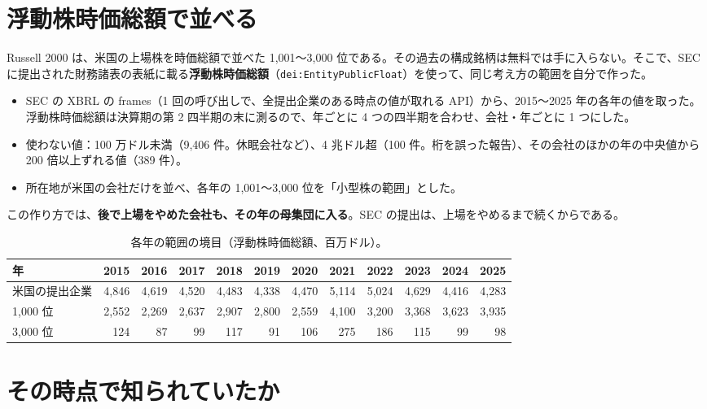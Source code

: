 \documentclass[xelatex,ja=standard,jafont=haranoaji,a4paper,10pt,openany]{bxjsreport}
\newcommand{\code}[1]{\texttt{#1}}
\begin{document}
\section{浮動株時価総額で並べる}

Russell 2000 は、米国の上場株を時価総額で並べた 1,001〜3,000 位である。その過去の構成銘柄は無料では手に入らない。そこで、SEC に提出された財務諸表の表紙に載る\textbf{浮動株時価総額}（\code{dei:EntityPublicFloat}）を使って、同じ考え方の範囲を自分で作った。

\begin{itemize}
\item SEC の XBRL の frames（1 回の呼び出しで、全提出企業のある時点の値が取れる API）から、2015〜2025 年の各年の値を取った。浮動株時価総額は決算期の第 2 四半期の末に測るので、年ごとに 4 つの四半期を合わせ、会社・年ごとに 1 つにした。
\item 使わない値：100 万ドル未満（9,406 件。休眠会社など）、4 兆ドル超（100 件。桁を誤った報告）、その会社のほかの年の中央値から 200 倍以上ずれる値（389 件）。
\item 所在地が米国の会社だけを並べ、各年の 1,001〜3,000 位を「小型株の範囲」とした。
\end{itemize}

この作り方では、\textbf{後で上場をやめた会社も、その年の母集団に入る}。SEC の提出は、上場をやめるまで続くからである。

\begin{table}[H]
\centering
\caption{各年の範囲の境目（浮動株時価総額、百万ドル）。}
\label{tab:band}
\small
\setlength{\tabcolsep}{4pt}
\begin{tabular}{lrrrrrrrrrrr}
\toprule
年 & 2015 & 2016 & 2017 & 2018 & 2019 & 2020 & 2021 & 2022 & 2023 & 2024 & 2025 \\
\midrule
米国の提出企業 & 4,846 & 4,619 & 4,520 & 4,483 & 4,338 & 4,470 & 5,114 & 5,024 & 4,629 & 4,416 & 4,283 \\
1,000 位 & 2,552 & 2,269 & 2,637 & 2,907 & 2,800 & 2,559 & 4,100 & 3,200 & 3,368 & 3,623 & 3,935 \\
3,000 位 & 124 & 87 & 99 & 117 & 91 & 106 & 275 & 186 & 115 & 99 & 98 \\
\bottomrule
\end{tabular}
\end{table}

\section{その時点で知られていたか}
\end{document}
